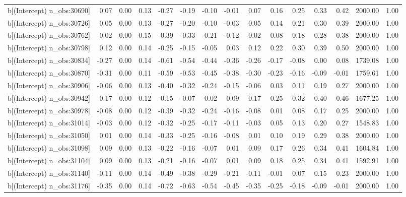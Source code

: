 \begin{table}[ht]
\begin{tabular}{rrrrrrrrrrrrrrr}
  b[(Intercept) n\_obs:30690] & 0.07 & 0.00 & 0.13 & -0.27 & -0.19 & -0.10 & -0.01 & 0.07 & 0.16 & 0.25 & 0.33 & 0.42 & 2000.00 & 1.00 \\ 
  b[(Intercept) n\_obs:30726] & 0.05 & 0.00 & 0.13 & -0.27 & -0.20 & -0.10 & -0.03 & 0.05 & 0.14 & 0.21 & 0.30 & 0.39 & 2000.00 & 1.00 \\ 
  b[(Intercept) n\_obs:30762] & -0.02 & 0.00 & 0.15 & -0.39 & -0.33 & -0.21 & -0.12 & -0.02 & 0.08 & 0.18 & 0.28 & 0.38 & 2000.00 & 1.00 \\ 
  b[(Intercept) n\_obs:30798] & 0.12 & 0.00 & 0.14 & -0.25 & -0.15 & -0.05 & 0.03 & 0.12 & 0.22 & 0.30 & 0.39 & 0.50 & 2000.00 & 1.00 \\ 
  b[(Intercept) n\_obs:30834] & -0.27 & 0.00 & 0.14 & -0.61 & -0.54 & -0.44 & -0.36 & -0.26 & -0.17 & -0.08 & 0.00 & 0.08 & 1739.08 & 1.00 \\ 
  b[(Intercept) n\_obs:30870] & -0.31 & 0.00 & 0.11 & -0.59 & -0.53 & -0.45 & -0.38 & -0.30 & -0.23 & -0.16 & -0.09 & -0.01 & 1759.61 & 1.00 \\ 
  b[(Intercept) n\_obs:30906] & -0.06 & 0.00 & 0.13 & -0.40 & -0.32 & -0.24 & -0.15 & -0.06 & 0.03 & 0.11 & 0.19 & 0.27 & 2000.00 & 1.00 \\ 
  b[(Intercept) n\_obs:30942] & 0.17 & 0.00 & 0.12 & -0.15 & -0.07 & 0.02 & 0.09 & 0.17 & 0.25 & 0.32 & 0.40 & 0.46 & 1677.25 & 1.00 \\ 
  b[(Intercept) n\_obs:30978] & -0.08 & 0.00 & 0.12 & -0.39 & -0.32 & -0.24 & -0.16 & -0.08 & 0.01 & 0.08 & 0.17 & 0.25 & 2000.00 & 1.00 \\ 
  b[(Intercept) n\_obs:31014] & -0.03 & 0.00 & 0.12 & -0.32 & -0.25 & -0.17 & -0.11 & -0.03 & 0.05 & 0.13 & 0.20 & 0.27 & 1548.83 & 1.00 \\ 
  b[(Intercept) n\_obs:31050] & 0.01 & 0.00 & 0.14 & -0.33 & -0.25 & -0.16 & -0.08 & 0.01 & 0.10 & 0.19 & 0.29 & 0.38 & 2000.00 & 1.00 \\ 
  b[(Intercept) n\_obs:31098] & 0.09 & 0.00 & 0.13 & -0.22 & -0.16 & -0.07 & 0.01 & 0.09 & 0.17 & 0.26 & 0.34 & 0.41 & 1604.84 & 1.00 \\ 
  b[(Intercept) n\_obs:31104] & 0.09 & 0.00 & 0.13 & -0.21 & -0.16 & -0.07 & 0.01 & 0.09 & 0.18 & 0.25 & 0.34 & 0.41 & 1592.91 & 1.00 \\ 
  b[(Intercept) n\_obs:31140] & -0.11 & 0.00 & 0.14 & -0.49 & -0.38 & -0.29 & -0.21 & -0.11 & -0.01 & 0.07 & 0.15 & 0.23 & 2000.00 & 1.00 \\ 
  b[(Intercept) n\_obs:31176] & -0.35 & 0.00 & 0.14 & -0.72 & -0.63 & -0.54 & -0.45 & -0.35 & -0.25 & -0.18 & -0.09 & -0.01 & 2000.00 & 1.00 \\ 

\end{tabular}
\end{table}
